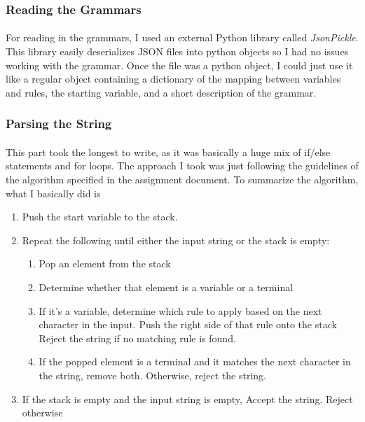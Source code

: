 \documentclass[11pt]{article}
\begin{document}
    

\subsubsection*{Reading the Grammars}
\paragraph{} For reading in the grammars, I used an external Python library called \emph{JsonPickle}. This library easily deserializes JSON files into python objects so I had no issues working with the grammar. Once the file was a python object, I could just use it like a regular object containing a dictionary of the mapping between variables and rules, the starting variable, and a short description of the grammar.

\subsubsection*{Parsing the String} 
\paragraph{}This part took the longest to write, as it was basically a huge mix of if/else statements and for loops. The approach I took was just following the guidelines of the algorithm specified in the assignment document. To summarize the algorithm, what I basically did is 
    \begin{enumerate}
    \item Push the start variable to the stack.
    \item Repeat the following until either the input string or the stack is empty:
        \begin{enumerate}
        \item Pop an element from the stack
        \item Determine whether that element is a variable or a terminal
        \item If it's a variable, determine which rule to apply based on the next character in the input. Push the right side of that rule onto the stack Reject the string if no matching rule is found.
        \item If the popped element is a terminal and it matches the next character in the string, remove both. Otherwise, reject the string.
        \end{enumerate}
    \item If the stack is empty and the input string is empty, Accept the string. Reject otherwise
    \end{enumerate}
\end{document}
